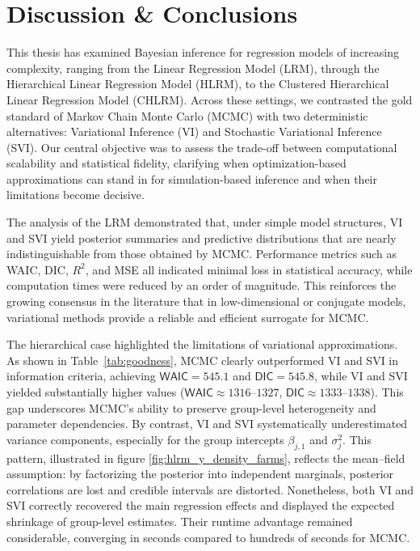 \chapter{Discussion \& Conclusions}

This thesis has examined Bayesian inference for regression models of increasing complexity, ranging from the Linear Regression Model (LRM), through the Hierarchical Linear Regression Model (HLRM), to the Clustered Hierarchical Linear Regression Model (CHLRM). Across these settings, we contrasted the gold standard of Markov Chain Monte Carlo (MCMC) with two deterministic alternatives: Variational Inference (VI) and Stochastic Variational Inference (SVI). Our central objective was to assess the trade-off between computational scalability and statistical fidelity, clarifying when optimization-based approximations can stand in for simulation-based inference and when their limitations become decisive.

\vspace{0.3cm}

The analysis of the LRM demonstrated that, under simple model structures, VI and SVI yield posterior summaries and predictive distributions that are nearly indistinguishable from those obtained by MCMC. Performance metrics such as WAIC, DIC, $R^2$, and MSE all indicated minimal loss in statistical accuracy, while computation times were reduced by an order of magnitude. This reinforces the growing consensus in the literature \cite{Ormerod2010-bc, Blei2016VariationalIA, zhang2018advancesvariationalinference} that in low-dimensional or conjugate models, variational methods provide a reliable and efficient surrogate for MCMC.

\vspace{0.3cm}

The hierarchical case highlighted the limitations of variational approximations. As shown in Table~\ref{tab:goodness}, MCMC clearly outperformed VI and SVI in information criteria, achieving $\mathsf{WAIC}=545.1$ and $\mathsf{DIC}=545.8$, while VI and SVI yielded substantially higher values ($\mathsf{WAIC}\approx 1316$--$1327$, $\mathsf{DIC}\approx 1333$--$1338$). This gap underscores MCMC's ability to preserve group-level heterogeneity and parameter dependencies. By contrast, VI and SVI systematically underestimated variance components, especially for the group intercepts $\beta_{j,1}$ and $\sigma_j^2$. This pattern, illustrated in figure \ref{fig:hlrm_y_density_farms}, reflects the mean--field assumption: by factorizing the posterior into independent marginals, posterior correlations are lost and credible intervals are distorted. Nonetheless, both VI and SVI correctly recovered the main regression effects and displayed the expected shrinkage of group-level estimates. Their runtime advantage remained considerable, converging in seconds compared to hundreds of seconds for MCMC.

